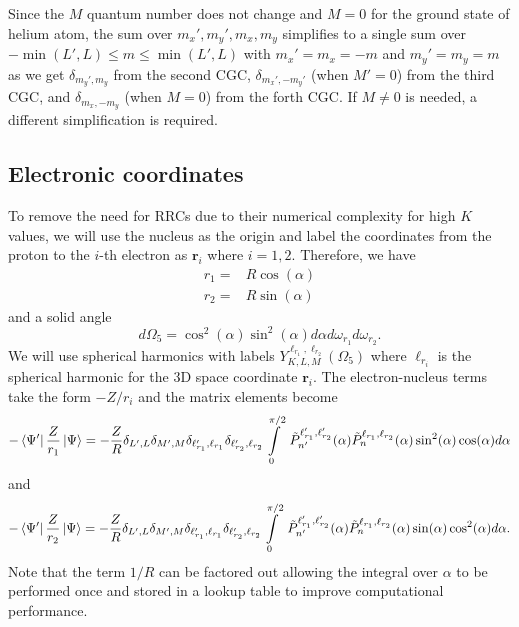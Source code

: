 Since the $M$ quantum number does not change and $M=0$ for the ground state of helium atom, the sum over $m_x',m_y',m_x,m_y$ simplifies to a single sum over $-\min(L',L)\le m \le \min(L',L)$ with $m_x'=m_x=-m$ and $m_y'=m_y=m$ as we get $\delta_{m_y',m_y}$ from the second CGC, $\delta_{m_x',-m_y'}$ (when $M'=0$) from the third CGC, and $\delta_{m_x,-m_y}$ (when $M=0$) from the forth CGC. If $M\ne0$ is needed, a different simplification is required.


\subsection{Electronic coordinates} %
\label{sub:electronic_coordinates}
To remove the need for RRCs due to their numerical complexity for high $K$ values, we will use the nucleus as the origin and label the coordinates from the proton to the $i$-th electron as $\mathbf{r}_i$ where $i=1,2$. Therefore, we have
\begin{align}
r_1 =& R \cos(\alpha)\\
r_2 =& R \sin(\alpha)
\end{align}
and a solid angle 
\begin{equation}
  d\Omega_5 = \cos^2(\alpha)  \sin^2(\alpha) d\alpha d\omega_{r_1} d\omega_{r_2}.
\end{equation}
We will use spherical harmonics with labels $Y_{K,L,M}^{\ell_{r_1},\ell_{r_2}}(\Omega_5)$ where $\ell_{r_i}$ is the spherical harmonic for the 3D space coordinate $\mathbf{r}_i$. The electron-nucleus terms take the form $-Z/r_i$ and the  matrix elements become
\begin{equation}
  -\bra{\Psi'}\frac{Z}{r_1}\ket{\Psi} = -\frac{Z}{R}\delta_{L',L}\delta_{M',M}\delta_{\ell_{r_1}',\ell_{r_1}}\delta_{\ell_{r_2}',\ell_{r_2}} \int\limits_0^{\pi/2}\ \tilde{P}^{\ell_{r_1}',\ell_{r_2}'}_{n'}(\alpha) \tilde{P}^{\ell_{r_1},\ell_{r_2}}_{n}(\alpha) \sin^2(\alpha) \cos(\alpha)d\alpha
\end{equation}
and 
\begin{equation}
  -\bra{\Psi'}\frac{Z}{r_2}\ket{\Psi} = -\frac{Z}{R}\delta_{L',L}\delta_{M',M}\delta_{\ell_{r_1}',\ell_{r_1}}\delta_{\ell_{r_2}',\ell_{r_2}} \int\limits_0^{\pi/2}\ \tilde{P}^{\ell_{r_1}',\ell_{r_2}'}_{n'}(\alpha) \tilde{P}^{\ell_{r_1},\ell_{r_2}}_{n}(\alpha) \sin(\alpha) \cos^2(\alpha)d\alpha.
\end{equation}
Note that the term $1/R$ can be factored out allowing the integral over $\alpha$ to be performed once and stored in a lookup table to improve computational performance.

